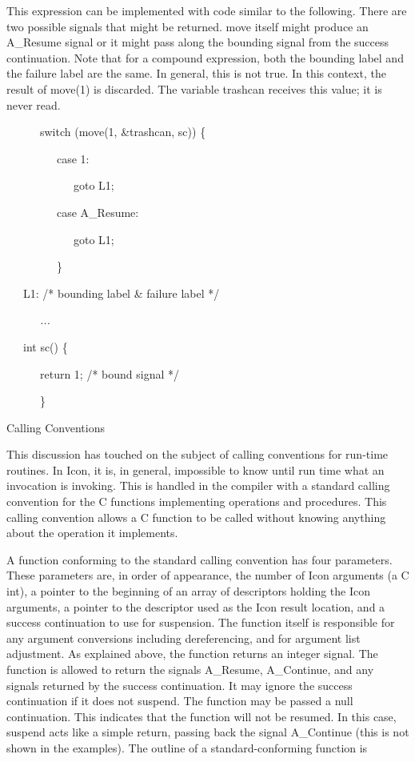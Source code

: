 This expression can be implemented with code similar to the
following. There are two possible signals that might be returned. move
itself might produce an A\_Resume signal or it might pass along the
bounding signal from the success continuation. Note that for a
compound expression, both the bounding label and the failure label are
the same. In general, this is not true. In this context, the result of
move(1) is discarded. The variable trashcan receives this value; it is
never read.

{\ttfamily\mdseries
\ \ \ \ \ \ switch (move(1, \&trashcan, sc)) \{}

{\ttfamily\mdseries
\ \ \ \ \ \ \ \ \ case 1:}

{\ttfamily\mdseries
\ \ \ \ \ \ \ \ \ \ \ \ goto L1;}

{\ttfamily\mdseries
\ \ \ \ \ \ \ \ \ case A\_Resume:}

{\ttfamily\mdseries
\ \ \ \ \ \ \ \ \ \ \ \ goto L1;}

{\ttfamily\mdseries
\ \ \ \ \ \ \ \ \ \}}

{\ttfamily\mdseries
\ \ \ L1: /* bounding label \& failure label */}

{\ttfamily\mdseries
\ \ \ \ \ \ \textit{...}}


\bigskip

{\ttfamily\mdseries
\ \ \ int sc() \{}

{\ttfamily\mdseries
\ \ \ \ \ \ return 1; /* bound signal */}

{\ttfamily\mdseries
\ \ \ \ \ \ \}}

{\sffamily
Calling Conventions}


This discussion has touched on the subject of calling conventions for
run-time routines. In Icon, it is, in general, impossible to know
until run time what an invocation is invoking. This is handled in the
compiler with a standard calling convention for the C functions
implementing operations and procedures. This calling convention allows
a C function to be called without knowing anything about the operation
it implements.

A function conforming to the standard calling convention has four
parameters. These parameters are, in order of appearance, the number
of Icon arguments (a C int), a pointer to the beginning of an array of
descriptors holding the Icon arguments, a pointer to the descriptor
used as the Icon result location, and a success continuation to use
for suspension. The function itself is responsible for any argument
conversions including dereferencing, and for argument list
adjustment. As explained above, the function returns an integer
signal. The function is allowed to return the signals A\_Resume,
A\_Continue, and any signals returned by the success continuation. It
may ignore the success continuation if it does not suspend. The
function may be passed a null continuation. This indicates that the
function will not be resumed. In this case, suspend acts like a simple
return, passing back the signal A\_Continue (this is not shown in the
examples). The outline of a standard-conforming function is

